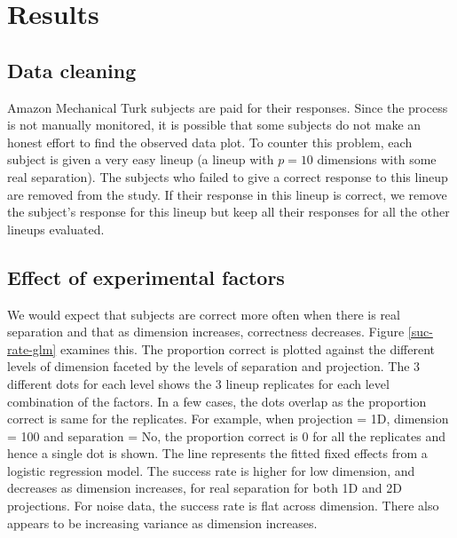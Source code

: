 \section{Results} \label{sec:results}

\subsection{Data cleaning}

Amazon Mechanical Turk subjects are paid for their responses. Since the process is not manually monitored, it is possible that some subjects do not make an honest effort to find the observed data plot. To counter this problem, each subject is given a very easy lineup (a lineup with $p = 10$ dimensions with some real separation). The subjects who failed to give a correct response to this lineup are removed from the study. If their response in this lineup is correct, we remove the subject's response for this lineup but keep all their responses for all the other lineups evaluated.

\subsection{Effect of experimental factors} \label{effects}

We would expect that subjects are correct more often when there is real separation and that as dimension increases, correctness decreases. Figure \ref{suc-rate-glm} examines this. The proportion correct is plotted against the different levels of dimension faceted by the levels of separation and projection. The 3 different dots for each level shows the 3 lineup replicates for each level combination of the factors. In a few cases, the dots overlap as the proportion correct is same for the replicates. For example, when projection = 1D, dimension = 100 and separation = No, the proportion correct is 0 for all the replicates and hence a single dot is shown. The line represents the fitted fixed effects from a logistic regression model. The success rate is higher for low dimension, and decreases as dimension increases, for real separation for both 1D and 2D projections. For noise data, the success rate is flat across dimension. There also appears to be increasing variance as dimension increases.


